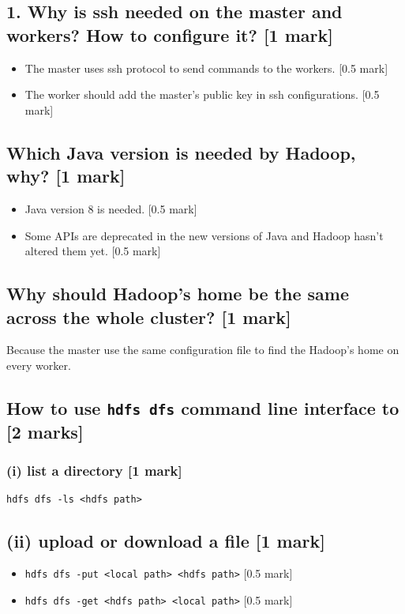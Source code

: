 \documentclass[11pt,a4paper]{article}
\begin{document}
\subsection*{1. Why is ssh needed on the master and workers? How to configure it? [1 mark]}
\begin{itemize}
\item The master uses ssh protocol to send commands to the workers. [0.5 mark]
\item The worker should add the master's public key in ssh configurations. [0.5 mark]
\end{itemize}

\subsection*{Which Java version is needed by Hadoop, why? [1 mark]}
\begin{itemize}
\item Java version 8 is needed. [0.5 mark]
\item Some APIs are deprecated in the new versions of Java and Hadoop hasn't altered them yet. [0.5 mark]
\end{itemize}

\subsection*{Why should Hadoop's home be the same across the whole cluster? [1 mark]}
Because the master use the same configuration file to find the Hadoop's home on every worker.

\subsection*{How to use \texttt{hdfs dfs} command line interface to [2 marks]}

\subsubsection*{(i) list a directory [1 mark]}
\texttt{hdfs dfs -ls <hdfs path>}

\subsection*{(ii) upload or download a file [1 mark]}
\begin{itemize}
\item \texttt{hdfs dfs -put <local path> <hdfs path>} [0.5 mark]
\item \texttt{hdfs dfs -get <hdfs path> <local path>} [0.5 mark]
\end{itemize}
\end{document}
